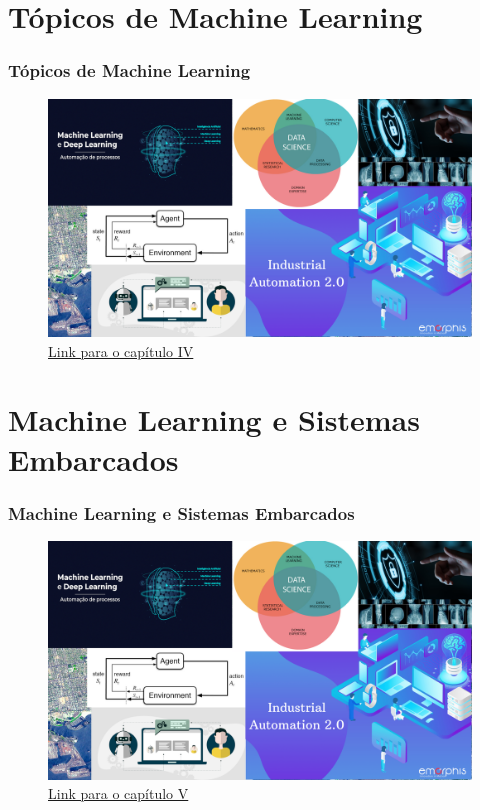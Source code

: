 \documentclass{beamer}
\begin{document}
\section{Tópicos de Machine Learning}

\begin{frame}

    \frametitle{Tópicos de Machine Learning}
    \begin{figure}[ht]
        \centering
        \includegraphics[scale=0.5]{Capitulo4.png}
        \caption{\href{./capitulos/Capitulo_04/Capitulo04.pdf}{Link para o capítulo IV}}
    \end{figure}

\end{frame}

\section{Machine Learning e Sistemas Embarcados}

\begin{frame}

    \frametitle{Machine Learning e Sistemas Embarcados}
    \begin{figure}[ht]
        \centering
        \includegraphics[scale=0.5]{Capitulo5.png}
        \caption{\href{run:./capitulos/Capitulo_05/Capitulo05.pdf}{Link para o capítulo V}}
    \end{figure}

\end{frame}
\end{document}
